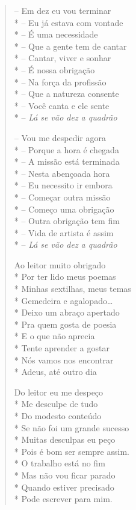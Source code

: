\begin{verse}
-- Em dez eu vou terminar\\*
-- Eu já estava com vontade\\*
-- É uma necessidade\\*
-- Que a gente tem de cantar\\*
-- Cantar, viver e sonhar\\*
-- É nossa obrigação\\*
-- Na força da profissão\\*
-- Que a natureza consente\\*
-- Você canta e ele sente\\*
-- \textit{Lá se vão dez a quadrão}

-- Vou me despedir agora\\*
-- Porque a hora é chegada\\*
-- A missão está terminada\\*
-- Nesta abençoada hora\\*
-- Eu necessito ir embora\\*
-- Começar outra missão\\*
-- Começo uma obrigação\\*
-- Outra obrigação tem fim\\*
-- Vida de artista é assim\\*
-- \textit{Lá se vão dez a quadrão}

Ao leitor muito obrigado\\*
Por ter lido meus poemas\\*
Minhas sextilhas, meus temas\\*
Gemedeira e agalopado\ldots{}\\*
Deixo um abraço apertado\\*
Pra quem gosta de poesia\\*
E o que não aprecia\\*
Tente aprender a gostar\\*
Nós vamos nos encontrar\\*
Adeus, até outro dia

Do leitor eu me despeço\\*
Me desculpe de tudo\\*
Do modesto conteúdo\\*
Se não foi um grande sucesso\\*
Muitas desculpas eu peço\\*
Pois é bom ser sempre assim.\\*
O trabalho está no fim\\*
Mas não vou ficar parado\\*
Quando estiver precisado\\*
Pode escrever para mim.
\end{verse}

